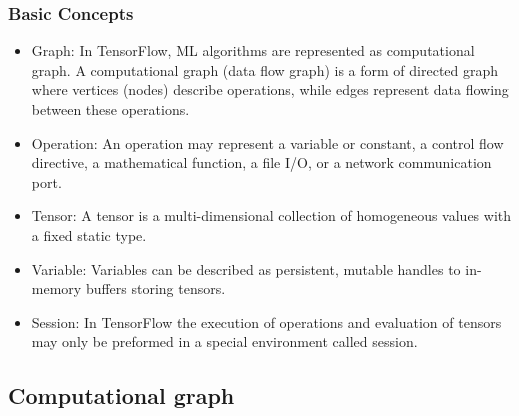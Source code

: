 \begin{frame}
  \MyLogo
  \frametitle{Basic Concepts}

\begin{itemize}

\item[\raisebox{-0.4ex}{\alert{\HandRight}}] Graph: In TensorFlow, ML algorithms are represented as computational graph. A computational graph (data flow graph) is a form of directed graph where vertices (nodes) describe operations, while edges represent data flowing between these operations.
	  	
\item Operation: An operation may represent a variable or constant, a control flow directive, a mathematical function, a file I/O, or a network communication port.
	  	
\item Tensor: A tensor is a multi-dimensional collection of homogeneous values with a fixed static type.
	  	
\item Variable: Variables can be described as persistent, mutable handles to in-memory buffers storing tensors.
	  	
\item[\raisebox{-0.4ex}{\alert{\HandRight}}] Session: In TensorFlow the execution of operations and evaluation of tensors may only be preformed in a special environment called session.
	  	
\end{itemize}

\end{frame}

\subsection{Computational graph}

